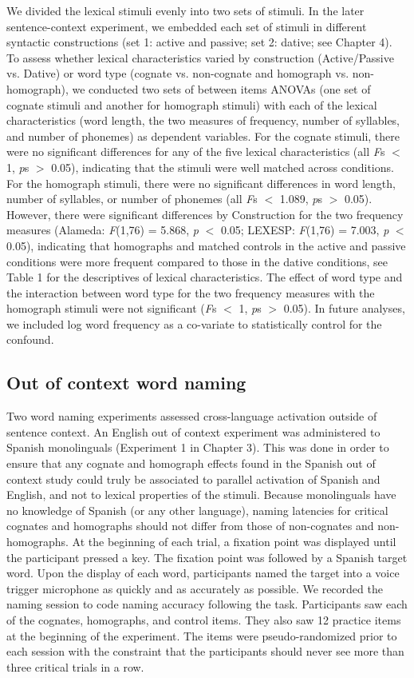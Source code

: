 We divided the lexical stimuli evenly into two sets of stimuli. In the later sentence-context experiment, we embedded each set of stimuli in different syntactic constructions (set 1: active and passive; set 2: dative; see Chapter 4). To assess whether lexical characteristics varied by construction (Active\slash Passive vs. Dative) or word type (cognate vs. non-cognate and homograph vs. non-homograph), we conducted two sets of between items ANOVAs (one set of cognate stimuli and another for homograph stimuli) with each of the lexical characteristics (word length, the two measures of frequency, number of syllables, and number of phonemes) as dependent variables. For the cognate stimuli, there were no significant differences for any of the five lexical characteristics (all \emph{F}s $<$ 1, \emph{p}s $>$ 0.05), indicating that the stimuli were well matched across conditions. For the homograph stimuli, there were no significant differences in word length, number of syllables, or number of phonemes (all \emph{F}s $<$ 1.089, \emph{p}s $>$ 0.05). However, there were significant differences by Construction for the two frequency measures (Alameda: \emph{F}(1,76) = 5.868, \emph{p} $<$ 0.05; LEXESP: \emph{F}(1,76) = 7.003, \emph{p} $<$ 0.05), indicating that homographs and matched controls in the active and passive conditions were more frequent compared to those in the dative conditions, see Table 1 for the descriptives of lexical characteristics. The effect of word type and the interaction between word type for the two frequency measures with the homograph stimuli were not significant (\emph{F}s $<$ 1, \emph{p}s $>$ 0.05). In future analyses, we included log word frequency as a co-variate to statistically control for the confound. 

\subsection{Out of context word naming}
\label{outofcontextwordnaming}

Two word naming experiments assessed cross-language activation outside of sentence context. An English out of context experiment was administered to Spanish monolinguals (Experiment 1 in Chapter 3). This was done in order to ensure that any cognate and homograph effects found in the Spanish out of context study could truly be associated to parallel activation of Spanish and English, and not to lexical properties of the stimuli. Because monolinguals have no knowledge of Spanish (or any other language), naming latencies for critical cognates and homographs should not differ from those of non-cognates and non-homographs. At the beginning of each trial, a fixation point was displayed until the participant pressed a key. The fixation point was followed by a Spanish target word. Upon the display of each word, participants named the target into a voice trigger microphone as quickly and as accurately as possible. We recorded the naming session to code naming accuracy following the task. Participants saw each of the cognates, homographs, and control items. They also saw 12 practice items at the beginning of the experiment. The items were pseudo-randomized prior to each session with the constraint that the participants should never see more than three critical trials in a row. 

